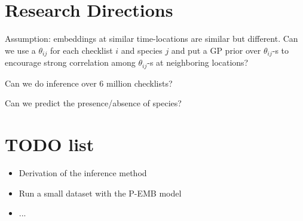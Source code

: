 \documentclass{article}
\begin{document}
\section{Research Directions}

Assumption: embeddings at similar time-locations are similar but different. Can we use a $\theta_{ij}$ for each checklist $i$ and species $j$ and put a GP prior over $\theta_{ij}$-s to encourage strong correlation among $\theta_{ij}$-s at neighboring locations?  

Can we do inference over 6 million checklists?

Can we predict the presence/absence of species?

\section{TODO list}
\begin{itemize}
\item Derivation of the inference method
\item Run a small dataset with the P-EMB model
\item ...
\end{itemize}
\end{document}
